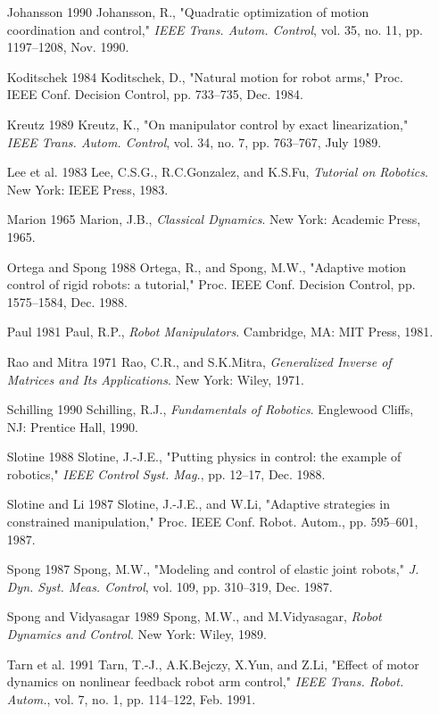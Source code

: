 \documentclass[12pt,a4paper]{ctexart}
\begin{document}
\begin{enumerate}
\item [Johansson 1990] Johansson, R., "Quadratic optimization of motion coordination and control," \textit{IEEE Trans. Autom. Control}, vol. 35, no. 11, pp. 1197--1208, Nov. 1990.

\item [Koditschek 1984] Koditschek, D., "Natural motion for robot arms," Proc. IEEE Conf. Decision Control, pp. 733--735, Dec. 1984.

\item [Kreutz 1989] Kreutz, K., "On manipulator control by exact linearization," \textit{IEEE Trans. Autom. Control}, vol. 34, no. 7, pp. 763--767, July 1989.

\item [Lee et al. 1983] Lee, C.S.G., R.C.Gonzalez, and K.S.Fu, \textit{Tutorial on Robotics}. New York: IEEE Press, 1983.

\item [Marion 1965] Marion, J.B., \textit{Classical Dynamics}. New York: Academic Press, 1965.

\item [Ortega and Spong 1988] Ortega, R., and Spong, M.W., "Adaptive motion control of rigid robots: a tutorial," Proc. IEEE Conf. Decision Control, pp. 1575--1584, Dec. 1988.

\item [Paul 1981] Paul, R.P., \textit{Robot Manipulators}. Cambridge, MA: MIT Press, 1981.

\item [Rao and Mitra 1971] Rao, C.R., and S.K.Mitra, \textit{Generalized Inverse of Matrices and Its Applications}. New York: Wiley, 1971.

\item [Schilling 1990] Schilling, R.J., \textit{Fundamentals of Robotics}. Englewood Cliffs, NJ: Prentice Hall, 1990.

\item [Slotine 1988] Slotine, J.-J.E., "Putting physics in control: the example of robotics," \textit{IEEE Control Syst. Mag.}, pp. 12--17, Dec. 1988.

\item [Slotine and Li 1987] Slotine, J.-J.E., and W.Li, "Adaptive strategies in constrained manipulation," Proc. IEEE Conf. Robot. Autom., pp. 595--601, 1987.

\item [Spong 1987] Spong, M.W., "Modeling and control of elastic joint robots," \textit{J. Dyn. Syst. Meas. Control}, vol. 109, pp. 310--319, Dec. 1987.

\item [Spong and Vidyasagar 1989] Spong, M.W., and M.Vidyasagar, \textit{Robot Dynamics and Control}. New York: Wiley, 1989.

\item [Tarn et al. 1991] Tarn, T.-J., A.K.Bejczy, X.Yun, and Z.Li, "Effect of motor dynamics on nonlinear feedback robot arm control," \textit{IEEE Trans. Robot. Autom.}, vol. 7, no. 1, pp. 114--122, Feb. 1991.
\end{enumerate}
\end{document}
